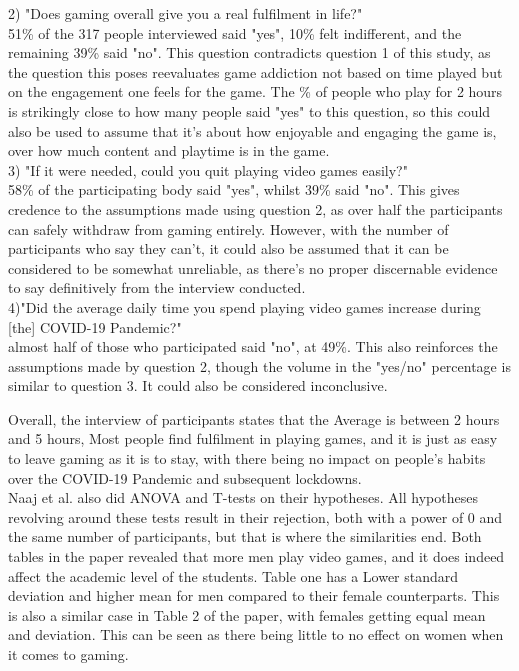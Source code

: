 \documentclass[conference]{IEEEtran}
\begin{document}
2) "Does gaming overall give you a real fulfilment in life?"\\
51\% of the 317 people interviewed said "yes", 10\% felt indifferent, and the remaining 39\% said "no".  This question contradicts question 1 of this study, as the question this poses reevaluates game addiction not based on time played but on the engagement one feels for the game. The \% of people who play for 2 hours is strikingly close to how many people said "yes" to this question, so this could also be used to assume that it's about how enjoyable and engaging the game is, over how much content and playtime is in the game.\\

3) "If it were needed, could you quit playing video games easily?"\\
58\% of the participating body said "yes", whilst 39\% said "no". This gives credence to the assumptions made using question 2, as over half the participants can safely withdraw from gaming entirely. However, with the number of participants who say they can't, it could also be assumed that it can be considered to be somewhat unreliable, as there's no proper discernable evidence to say definitively from the interview conducted.\\ 
 
4)"Did the average daily time you spend playing video games increase during [the] COVID-19 Pandemic?"\\
almost half of those who participated said "no", at 49\%. This also reinforces the assumptions made by question 2, though the volume in the "yes/no" percentage is similar to question 3. It could also be considered inconclusive.

Overall, the interview of participants states that the Average is between 2 hours and 5 hours, Most people find fulfilment in playing games, and it is just as easy to leave gaming as it is to stay, with there being no impact on people's habits over the COVID-19 Pandemic and subsequent lockdowns.\\

Naaj et al. also did ANOVA and T-tests on their hypotheses. All hypotheses revolving around these tests result in their rejection, both with a power of 0 and the same number of participants, but that is where the similarities end. Both tables in the paper revealed that more men play video games, and it does indeed affect the academic level of the students. Table one has a Lower standard deviation and higher mean for men compared to their female counterparts. This is also a similar case in Table 2 of the paper, with females getting equal mean and deviation. This can be seen as there being little to no effect on women when it comes to gaming.\\
\end{document}
